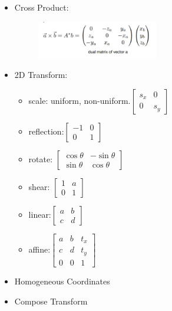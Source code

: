 \documentclass{article}
\begin{document}
\begin{itemize}
\item Cross Product:
\begin{figure}[H]
        \centering
        \includegraphics[width=0.5\textwidth]{imgs/cross_product.jpeg}
        
    \end{figure}
    \item 
2D Transform:
\begin{itemize}
    \item scale: uniform, non-uniform.$\begin{bmatrix} s_x & 0 \\ 0 & s_y\end{bmatrix}$
    \item reflection:$\begin{bmatrix} -1 & 0 \\ 0 & 1\end{bmatrix}$
    \item rotate: $\begin{bmatrix} \cos \theta & -\sin\theta \\ \sin\theta & \cos \theta\end{bmatrix}$
    \item shear: $\begin{bmatrix} 1 & a \\ 0 & 1\end{bmatrix}$
    \item linear:$\begin{bmatrix} a & b \\ c & d\end{bmatrix}$
    \item affine:$\begin{bmatrix} a & b &t_x\\ c & d &t_y \\ 0&0&1\end{bmatrix}$
    
\end{itemize}

\item Homogeneous Coordinates

\item Compose Transform


\end{itemize}
\end{document}
